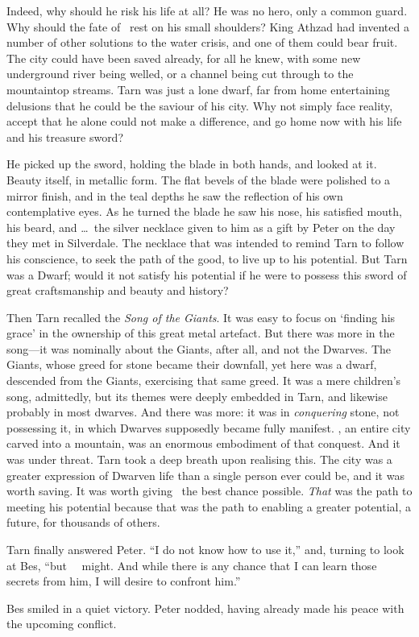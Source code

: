Indeed, why should he risk his life at all?  He was no hero, only a common guard.  Why should the fate of \korbarthrond\ rest on his small shoulders?  King Athzad had invented a number of other solutions to the water crisis, and one of them could bear fruit.  The city could have been saved already, for all he knew, with some new underground river being welled, or a channel being cut through to the mountaintop streams.  Tarn was just a lone dwarf, far from home entertaining delusions that he could be the saviour of his city.  Why not simply face reality, accept that he alone could not make a difference, and go home now with his life and his treasure sword?

He picked up the sword, holding the blade in both hands, and looked at it.  Beauty itself, in metallic form.  The flat bevels of the blade were polished to a mirror finish, and in the teal depths he saw the reflection of his own contemplative eyes.  As he turned the blade he saw his nose, his satisfied mouth, his beard, and \ldots\ the silver necklace given to him as a gift by Peter on the day they met in Silverdale.  The necklace that was intended to remind Tarn to follow his conscience, to seek the path of the good, to live up to his potential.  But Tarn was a Dwarf; would it not satisfy his potential  if he were to possess this sword of great craftsmanship and beauty and history?

Then Tarn recalled the \emph{Song of the Giants}.  It was easy to focus on `finding his grace' in the ownership of this great metal artefact.  But there was more in the song---it was nominally about the Giants, after all, and not the Dwarves.  The Giants, whose greed for stone became their downfall, yet here was a dwarf, descended from the Giants, exercising that same greed.  It was a mere children's song, admittedly, but its themes were deeply embedded in Tarn, and likewise probably in most dwarves.  And there was more: it was in \emph{conquering} stone, not possessing it, in which Dwarves supposedly became fully manifest.  \korbarthrond, an entire city carved into a mountain, was an enormous embodiment of that conquest.  And it was under threat.  Tarn took a deep breath upon realising this.  The city was a greater expression of Dwarven life than a single person ever could be, and it was worth saving.  It was worth giving \korbarthrond\ the best chance possible.  \emph{That} was the path to meeting his potential because that was the path to enabling a greater potential, a future, for thousands of others.

Tarn finally answered Peter.  ``I do not know how to use it,''  and, turning to look at Bes, ``but \mothzam\ \driktur\ might.  And while there is any chance that I can learn those secrets from him, I will desire to confront him.''

Bes smiled in a quiet victory.  Peter nodded, having already made his peace with the upcoming conflict.  





